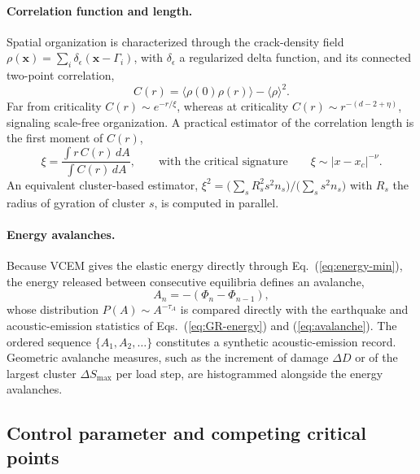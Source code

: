 \documentclass[preprint,12pt]{elsarticle}
\begin{document}
\paragraph{Correlation function and length.}
Spatial organization is characterized through the crack-density field
$\rho(\mathbf{x}) = \sum_i \delta_\epsilon(\mathbf{x}-\Gamma_i)$, with $\delta_\epsilon$
a regularized delta function, and its connected two-point correlation,
\begin{equation}
C(r) = \langle \rho(0)\rho(r)\rangle - \langle\rho\rangle^2.
\label{eq:corr}
\end{equation}
Far from criticality $C(r)\sim e^{-r/\xi}$, whereas at criticality
$C(r)\sim r^{-(d-2+\eta)}$, signaling scale-free organization. A practical estimator
of the correlation length is the first moment of $C(r)$,
\begin{equation}
\xi = \frac{\int r\,C(r)\,dA}{\int C(r)\,dA},
\qquad \text{with the critical signature} \qquad
\xi \sim |x-x_c|^{-\nu}.
\label{eq:xi}
\end{equation}
An equivalent cluster-based estimator,
$\xi^2 = \big(\sum_s R_s^2 s^2 n_s\big)/\big(\sum_s s^2 n_s\big)$ with $R_s$ the radius
of gyration of cluster $s$, is computed in parallel.

\paragraph{Energy avalanches.}
Because VCEM gives the elastic energy directly through Eq.~(\ref{eq:energy-min}), the
energy released between consecutive equilibria defines an avalanche,
\begin{equation}
A_n = -\left(\Phi_n - \Phi_{n-1}\right),
\label{eq:avalanche-vcem}
\end{equation}
whose distribution $P(A)\sim A^{-\tau_A}$ is compared directly with the
earthquake and acoustic-emission statistics of Eqs.~(\ref{eq:GR-energy}) and
(\ref{eq:avalanche}). The ordered sequence $\{A_1,A_2,\dots\}$ constitutes a synthetic
acoustic-emission record. Geometric avalanche measures, such as the increment of
damage $\Delta D$ or of the largest cluster $\Delta S_{\max}$ per load step, are
histogrammed alongside the energy avalanches.

\subsection{Control parameter and competing critical points}
\label{sec:control}
\end{document}
